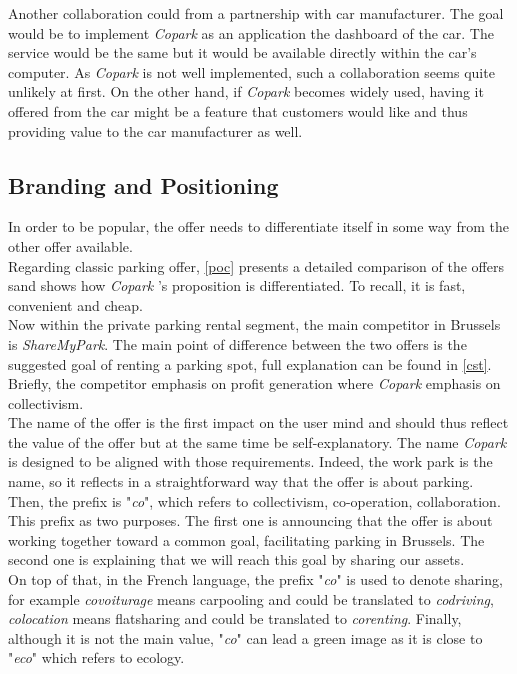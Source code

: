 \documentclass[12pt,a4paper,oneside]{book}
\newcommand{\bp}{\textit{Copark }}
\begin{document}
Another collaboration could from a partnership with car manufacturer. The goal would be to implement \bp as an application the dashboard of the car. The service would be the same but it would be available directly within the car's computer. As \bp is not well implemented, such a collaboration seems quite unlikely at first. On the other hand, if \bp becomes widely used, having it offered from the car might be a feature that customers would like and thus providing value to the car manufacturer as well.

\subsection{Branding and Positioning}

In order to be popular, the offer needs to differentiate itself in some way from the other offer available.\\

Regarding classic parking offer, \autoref{poc} presents a detailed comparison of the offers sand shows how \bp's proposition is differentiated. To recall, it is fast, convenient and cheap.\\

Now within the private parking rental segment, the main competitor in Brussels is \textit{ShareMyPark}. The main point of difference between the two offers is the suggested goal of renting a parking spot, full explanation can be found in \autoref{cst}. Briefly, the competitor emphasis on profit generation where \bp emphasis on collectivism.\\

The name of the offer is the first impact on the user mind and should thus reflect the value of the offer but at the same time be self-explanatory. The name \bp is designed to be aligned with those requirements. Indeed, the work park is the name, so it reflects in a straightforward way that the offer is about parking. Then, the prefix is "\textit{co}", which refers to collectivism, co-operation, collaboration. This prefix as two purposes. The first one is announcing that the offer is about working together toward a common goal, facilitating parking in Brussels. The second one is explaining that we will reach this goal by sharing our assets.\\
On top of that, in the French language, the prefix "\textit{co}" is used to denote sharing, for example \textit{covoiturage} means carpooling and could be translated to \textit{codriving}, \textit{colocation} means flatsharing and could be translated to \textit{corenting}. Finally, although it is not the main value, "\textit{co}" can lead a green image as it is close to "\textit{eco}" which refers to ecology.
\end{document}
